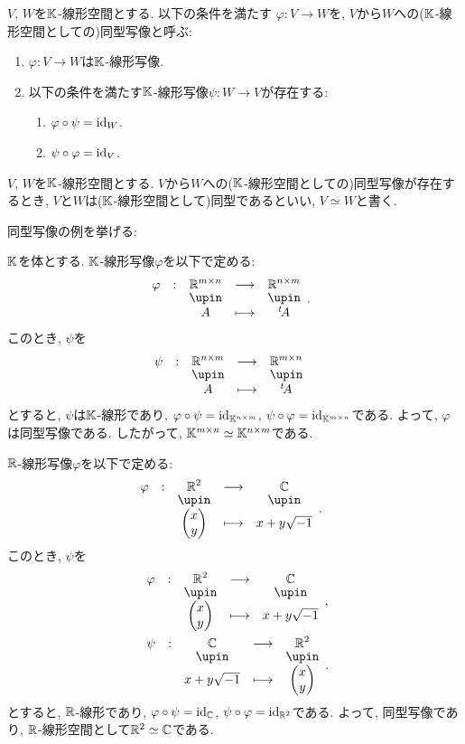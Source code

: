 \begin{definition}
  $V$, $W$を$\mathbb{K}$-線形空間とする.
  以下の条件を満たす
  $\varphi\colon V\to W$を,
  $V$から$W$への($\mathbb{K}$-線形空間としての)同型写像と呼ぶ:
  \begin{enumerate}
  \item $\varphi\colon V\to W$は$\mathbb{K}$-線形写像.
  \item 以下の条件を満たす$\mathbb{K}$-線形写像$\psi\colon W \to V$が存在する:
    \begin{enumerate}
      \item $\varphi\circ \psi=\operatorname{id}_W$.
      \item $\psi\circ \varphi=\operatorname{id}_V$.
    \end{enumerate}
  \end{enumerate}
\end{definition}
\begin{definition}
  $V$, $W$を$\mathbb{K}$-線形空間とする.
  $V$から$W$への($\mathbb{K}$-線形空間としての)同型写像が存在するとき,
  $V$と$W$は($\mathbb{K}$-線形空間として)同型であるといい,  
  $V\simeq W$と書く.
\end{definition}

同型写像の例を挙げる:
\begin{example}
  $\mathbb{K}$を体とする.
  $\mathbb{K}$-線形写像$\varphi$を以下で定める:
  \begin{align*}
    &\shazo{\varphi}{\RR^{m\times n}}{\RR^{n\times m}}{A}{\transposed{A}}.
  \end{align*}
  このとき,
  $\psi$を
  \begin{align*}
    &\shazo{\psi}{\RR^{n\times m}}{\RR^{m\times n}}{A}{\transposed{A}}
  \end{align*}
  とすると,
  $\psi$は$\mathbb{K}$-線形であり, $\varphi\circ \psi=\operatorname{id}_{\mathbb{K}^{n\times m}}$, $\psi\circ\varphi=\operatorname{id}_{\mathbb{K}^{m\times n}}$である.
  よって, $\varphi$は同型写像である.
  したがって, $\mathbb{K}^{m\times n}\simeq\mathbb{K}^{n\times m}$である.
\end{example}


\begin{example}
  $\mathbb{R}$-線形写像$\varphi$を以下で定める:
  \begin{align*}
    &\shazo{\varphi}{\RR^2}{\CC}{\begin{pmatrix}x\\y\end{pmatrix}}{x+y\sqrt{-1}}.
  \end{align*}
  このとき,
  $\psi$を
  \begin{align*}
    &\shazo{\varphi}{\RR^2}{\CC}{\begin{pmatrix}x\\y\end{pmatrix}}{x+y\sqrt{-1}},\\
   &\shazo{\psi}{\CC}{\RR^2}{x+y\sqrt{-1}}{\begin{pmatrix}x\\y\end{pmatrix}}.
  \end{align*}
  とすると,
  $\mathbb{R}$-線形であり,
  $\varphi\circ \psi=\operatorname{id}_{\mathbb{C}}$,
  $\psi\circ\varphi=\operatorname{id}_{\mathbb{R}^2}$である.
  よって, 同型写像であり,
  $\mathbb{R}$-線形空間として$\mathbb{R}^2\simeq\mathbb{C}$である.
\end{example}

